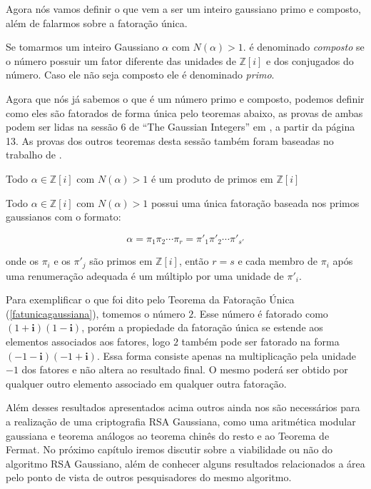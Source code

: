 Agora n\'os vamos definir o que vem a ser um inteiro gaussiano primo e composto, al\'em de falarmos sobre a fatora\c{c}\~ao \'unica.

\begin{Df}
Se tomarmos um inteiro Gaussiano $\alpha$ com $N(\alpha) > 1$. \'e denominado \textit{composto} se o n\'umero possuir um fator diferente das unidades de $\mathbb{Z}[i]$ e dos conjugados do n\'umero. Caso ele n\~ao seja composto ele \'e denominado \textit{primo}.
\end{Df}

Agora que n\'os j\'a sabemos o que \'e um n\'umero primo e composto, podemos definir como eles s\~ao fatorados de forma \'unica pelo teoremas abaixo, as provas de ambas podem ser lidas na sess\~ao 6 de ``The Gaussian Integers'' em \cite{conrad}, a partir da p\'agina 13. As provas dos outros teoremas desta sess\~ao tamb\'em foram baseadas no trabalho de \cite{conrad}.

\begin{Th}
 Todo $\alpha \in \mathbb{Z}[i]$ com $N(\alpha) > 1$ \'e um produto de primos em $\mathbb{Z}[i]$
\end{Th}

\begin{Th} \label{fatunicagaussiana}
 Todo $\alpha \in \mathbb{Z}[i]$ com $N(\alpha) > 1$ possui uma \'unica fatora\c{c}\~ao baseada nos primos gaussianos com o formato:

	$$\alpha = \pi_1 \pi_2 \cdots \pi_{r} = \pi'_1 \pi'_2 \cdots \pi'_{s'} $$

onde os $\pi_i$ e os $\pi'_j$ s\~ao primos em $\mathbb{Z}[i]$, ent\~ao $r=s$ e cada membro de $\pi_i$ ap\'os uma renumera\c{c}\~ao adequada \'e um m\'ultiplo por uma unidade de $\pi'_i$.

\end{Th}

Para exemplificar o que foi dito pelo Teorema da Fatora\c{c}\~ao \'Unica (\ref{fatunicagaussiana}), tomemos o n\'umero $2$. Esse n\'umero \'e fatorado como $(1 + \textbf{i})(1 - \textbf{i})$, por\'em a propiedade da fatora\c{c}\~ao \'unica se estende aos elementos associados aos fatores, logo $2$ tamb\'em pode ser fatorado na forma $(-1 - \textbf{i})(-1 + \textbf{i})$. Essa forma consiste apenas na multiplica\c{c}\~ao pela unidade $-1$ dos fatores e n\~ao altera ao resultado final. O mesmo poder\'a ser obtido por qualquer outro elemento associado em qualquer outra fatora\c{c}\~ao.

Al\'em desses resultados apresentados acima outros ainda nos s\~ao necess\'arios para a realiza\c{c}\~ao de uma criptografia RSA Gaussiana, como uma aritm\'etica modular gaussiana e teorema an\'alogos ao teorema chin\^es do resto e ao Teorema de Fermat. No pr\'oximo cap\'itulo iremos discutir sobre a viabilidade ou n\~ao do algoritmo RSA Gaussiano, al\'em de conhecer alguns resultados relacionados a \'area pelo ponto de vista de outros pesquisadores do mesmo algoritmo.
